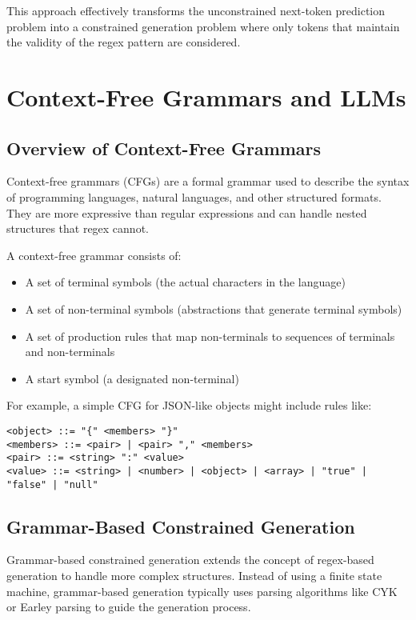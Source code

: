 \documentclass{article}
\begin{document}
This approach effectively transforms the unconstrained next-token prediction problem into a constrained generation problem where only tokens that maintain the validity of the regex pattern are considered.

\section{Context-Free Grammars and LLMs}

\subsection{Overview of Context-Free Grammars}

Context-free grammars (CFGs) are a formal grammar used to describe the syntax of programming languages, natural languages, and other structured formats. They are more expressive than regular expressions and can handle nested structures that regex cannot.

A context-free grammar consists of:
\begin{itemize}
    \item A set of terminal symbols (the actual characters in the language)
    \item A set of non-terminal symbols (abstractions that generate terminal symbols)
    \item A set of production rules that map non-terminals to sequences of terminals and non-terminals
    \item A start symbol (a designated non-terminal)
\end{itemize}

For example, a simple CFG for JSON-like objects might include rules like:
\begin{verbatim}
<object> ::= "{" <members> "}"
<members> ::= <pair> | <pair> "," <members>
<pair> ::= <string> ":" <value>
<value> ::= <string> | <number> | <object> | <array> | "true" | "false" | "null"
\end{verbatim}

\subsection{Grammar-Based Constrained Generation}

Grammar-based constrained generation extends the concept of regex-based generation to handle more complex structures. Instead of using a finite state machine, grammar-based generation typically uses parsing algorithms like CYK or Earley parsing to guide the generation process.
\end{document}
